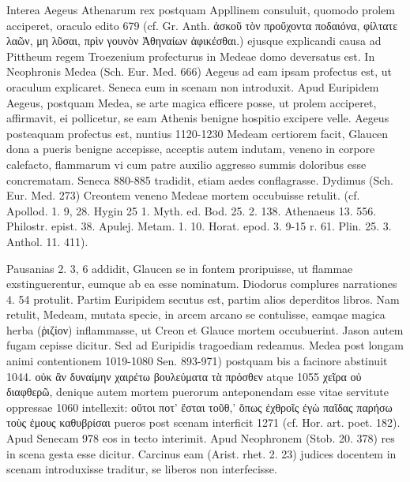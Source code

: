 \documentclass[landscape, a4paper, 11pt, oneside, polutonikogreek, german]{article}
\begin{document}
Interea Aegeus Athenarum rex postquam Appllinem consuluit, quomodo prolem acciperet, oraculo edito 679 (cf. Gr. Anth. ἀσκοῦ τὸν προὔχοντα ποδαιόνα, φίλτατε λαῶν, μη λῦσαι, πρὶν γουνὸν Ἀθηναίων ἀφικέσθαι.) ejusque explicandi causa ad Pittheum regem Troezenium profecturus in Medeae domo deversatus est. In Neophronis Medea (Sch. Eur. Med. 666) Aegeus ad eam ipsam profectus est, ut oraculum explicaret. Seneca eum in scenam non introduxit. Apud Euripidem Aegeus, postquam Medea, se arte magica efficere posse, ut prolem acciperet, affirmavit, ei pollicetur, se eam Athenis benigne hospitio excipere velle. Aegeus posteaquam profectus est, nuntius 1120-1230 Medeam certiorem facit, Glaucen dona a pueris benigne accepisse, acceptis autem indutam, veneno in corpore calefacto, flammarum vi cum patre auxilio aggresso summis doloribus esse concrematam. Seneca 880-885 tradidit, etiam aedes conflagrasse. Dydimus (Sch. Eur. Med. 273) Creontem veneno Medeae mortem occubuisse retulit. (cf. Apollod. 1. 9, 28. Hygin 25 1. Myth. ed. Bod. 25. 2. 138. Athenaeus 13. 556. Philostr. epist. 38. Apulej. Metam. 1. 10. Horat. epod. 3. 9-15 r. 61. Plin. 25. 3. Anthol. 11. 411).

Pausanias 2. 3, 6 addidit, Glaucen se in fontem proripuisse, ut flammae exstinguerentur, eumque ab ea esse nominatum. Diodorus complures narrationes 4. 54 protulit. Partim Euripidem secutus est, partim alios deperditos libros. Nam retulit, Medeam, mutata specie, in arcem arcano se contulisse, eamqae magica herba (ῥιζίον) inflammasse, ut Creon et Glauce mortem occubuerint. Jason autem fugam cepisse dicitur. Sed ad Euripidis tragoediam redeamus. Medea post longam animi contentionem 1019-1080 Sen. 893-971) postquam bis a facinore abstinuit 1044. οὐκ ἂν δυναίμην χαιρέτω βουλεύματα τὰ πρόσθεν atque 1055 χεῖρα οὐ διαφθερῶ, denique autem mortem puerorum anteponendam esse vitae servitute oppressae 1060 intellexit: οὔτοι ποτ' ἔσται τοῦθ,' ὅπως ἐχθροῖς ἐγὼ παῖδας παρήσω τοὺς ἐμους καθυβρίσαι pueros post scenam interficit 1271 (cf. Hor. art. poet. 182). Apud Senecam 978 eos in tecto interimit. Apud Neophronem (Stob. 20. 378) res in scena gesta esse dicitur. Carcinus eam (Arist. rhet. 2. 23) judices docentem in scenam introduxisse traditur, se liberos non interfecisse.
\end{document}
